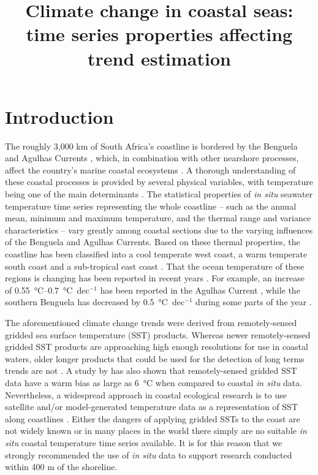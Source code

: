 \documentclass[]{ametsoc}
\title{Climate change in coastal seas: time series properties affecting trend estimation}
\affiliation{Department of Biodiversity and Conservation Biology, University of the Western Cape, Bellville, Republic of South Africa}
\begin{document}
\maketitle

\section{Introduction}
The roughly 3,000 km of South Africa's coastline is bordered by the Benguela and Agulhas Currents \citep[\emph{e.g.}][]{Roberts2005,Hutchings2009}, which, in combination with other nearshore processes, affect the country's marine coastal ecosystems \citep{Santos2012a}. A thorough understanding of these coastal processes is provided by several physical variables, with temperature being one of the main determinants \citep[\emph{e.g.}][]{Blanchette2008, Tittensor2010, Couce2012}. The statistical properties of \emph{in situ} seawater temperature time series representing the whole coastline -- such as the annual mean, minimum and maximum temperature, and the thermal range and variance characteristics -- vary greatly among coastal sections due to the varying influences of the Benguela and Agulhas Currents. Based on these thermal properties, the coastline has been classified into a cool temperate west coast, a warm temperate south coast and a sub-tropical east coast \citep{Smit2013}. That the ocean temperature of these regions is changing has been reported in recent years \citep{Mead2013}. For example, an increase of \SIrange{0.55}{0.7}{\degreeCelsius}~dec$^{-1}$ has been reported in the Agulhas Current \citep{Rouault2009,Rouault2010}, while the southern Benguela has decreased by \SI{0.5}{\degreeCelsius}~dec$^{-1}$ during some parts of the year \citep{Rouault2010}.

The aforementioned climate change trends were derived from remotely-sensed gridded sea surface temperature (SST) products. Whereas newer remotely-sensed gridded SST products are approaching high enough resolutions for use in coastal waters, older longer products that could be used for the detection of long terms trends are not \citep[\emph{e.g.}][]{Chao2009, Qiu2009, Vazquez-Cuervo2013}. A study by \citet{Smit2013} has also shown that remotely-sensed gridded SST data have a warm bias as large as \SI{6}{\degreeCelsius} when compared to coastal \emph{in situ} data. Nevertheless, a widespread approach in coastal ecological research is to use satellite and/or model-generated temperature data as a representation of SST along coastlines \citep[\emph{e.g.}][]{Blanchette2008, Broitman2008a, Tyberghein2012}. Either the dangers of applying gridded SSTs to the coast are not widely known or in many places in the world there simply are no suitable \emph{in situ} coastal temperature time series available. It is for this reason that we strongly recommended the use of \emph{in situ} data to support research conducted within 400 m of the shoreline.
\end{document}
